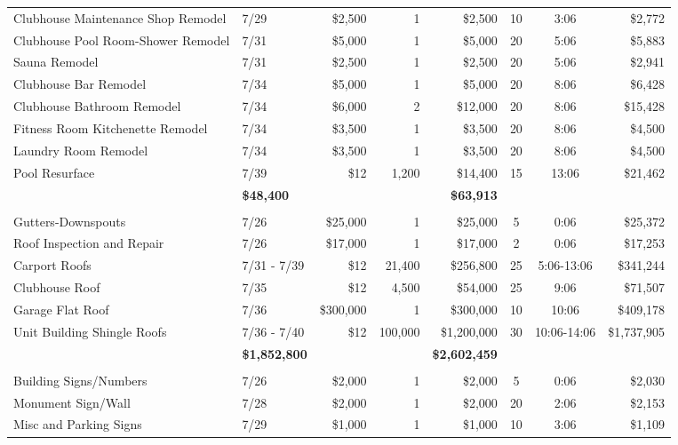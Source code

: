 \documentclass[11pt,letterpaper]{article}
\begin{document}
\begin{longtable}{p{4.2cm} p{1.6cm} r r r c c r}
\rowcolor{blue!12} Clubhouse Maintenance Shop Remodel & 7/29 & \$2,500 & 1 & \$2,500 & 10 & 3:06 & \$2,772 \\
Clubhouse Pool Room-Shower Remodel & 7/31 & \$5,000 & 1 & \$5,000 & 20 & 5:06 & \$5,883 \\
\rowcolor{blue!12} Sauna Remodel & 7/31 & \$2,500 & 1 & \$2,500 & 20 & 5:06 & \$2,941 \\
Clubhouse Bar Remodel & 7/34 & \$5,000 & 1 & \$5,000 & 20 & 8:06 & \$6,428 \\
\rowcolor{blue!12} Clubhouse Bathroom Remodel & 7/34 & \$6,000 & 2 & \$12,000 & 20 & 8:06 & \$15,428 \\
Fitness Room Kitchenette Remodel & 7/34 & \$3,500 & 1 & \$3,500 & 20 & 8:06 & \$4,500 \\
\rowcolor{blue!12} Laundry Room Remodel & 7/34 & \$3,500 & 1 & \$3,500 & 20 & 8:06 & \$4,500 \\
Pool Resurface & 7/39 & \$12 & 1,200 & \$14,400 & 15 & 13:06 & \$21,462 \\
\addlinespace[1pt] \multicolumn{4}{r}{} & \textbf{\$48,400} & & & \textbf{\$63,913} \\
\addlinespace[6pt]
\multicolumn{8}{l}{\textbf{Roofing}} \\
\rowcolor{blue!12} Gutters-Downspouts & 7/26 & \$25,000 & 1 & \$25,000 & 5 & 0:06 & \$25,372 \\
Roof Inspection and Repair & 7/26 & \$17,000 & 1 & \$17,000 & 2 & 0:06 & \$17,253 \\
\rowcolor{blue!12} Carport Roofs & 7/31 - 7/39 & \$12 & 21,400 & \$256,800 & 25 & 5:06-13:06 & \$341,244 \\
Clubhouse Roof & 7/35 & \$12 & 4,500 & \$54,000 & 25 & 9:06 & \$71,507 \\
\rowcolor{blue!12} Garage Flat Roof & 7/36 & \$300,000 & 1 & \$300,000 & 10 & 10:06 & \$409,178 \\
Unit Building Shingle Roofs & 7/36 - 7/40 & \$12 & 100,000 & \$1,200,000 & 30 & 10:06-14:06 & \$1,737,905 \\
\addlinespace[1pt] \multicolumn{4}{r}{} & \textbf{\$1,852,800} & & & \textbf{\$2,602,459} \\
\addlinespace[6pt]
\multicolumn{8}{l}{\textbf{Signage}} \\
\rowcolor{blue!12} Building Signs/Numbers & 7/26 & \$2,000 & 1 & \$2,000 & 5 & 0:06 & \$2,030 \\
Monument Sign/Wall & 7/28 & \$2,000 & 1 & \$2,000 & 20 & 2:06 & \$2,153 \\
\rowcolor{blue!12} Misc and Parking Signs & 7/29 & \$1,000 & 1 & \$1,000 & 10 & 3:06 & \$1,109 \\

\end{longtable}
\end{document}
